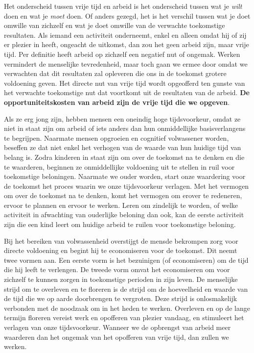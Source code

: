 Het onderscheid tussen vrije tijd en arbeid is het onderscheid tussen
wat je \emph{wilt} doen en wat je \emph{moet} doen. Of anders gezegd,
het is het verschil tussen wat je doet omwille van zichzelf en wat je
doet omwille van de verwachte toekomstige resultaten. Als iemand een
activiteit onderneemt, enkel en alleen omdat hij of zij er plezier in
heeft, ongeacht de uitkomst, dan zou het geen arbeid zijn, maar vrije
tijd. Per definitie heeft arbeid op zichzelf een negatief nut of
ongemak. Werken vermindert de menselijke tevredenheid, maar toch gaan we
ermee door omdat we verwachten dat dit resultaten zal opleveren die ons
in de toekomst grotere voldoening geven. Het directe nut van vrije tijd
wordt opgeofferd ten gunste van het verwachte toekomstige nut dat
voortkomt uit de resultaten van de arbeid. \textbf{De
opportuniteitskosten van arbeid zijn de vrije tijd die we opgeven}.

Als ze erg jong zijn, hebben mensen een oneindig hoge tijdsvoorkeur,
omdat ze niet in staat zijn om arbeid of iets anders dan hun
onmiddellijke basisverlangens te begrijpen. Naarmate mensen opgroeien en
cognitief volwassener worden, beseffen ze dat niet enkel het verhogen
van de waarde van hun huidige tijd van belang is. Zodra kinderen in
staat zijn om over de toekomst na te denken en die te waarderen,
beginnen ze onmiddellijke voldoening uit te stellen in ruil voor
toekomstige beloningen. Naarmate we ouder worden, start onze waardering
voor de toekomst het proces waarin we onze tijdsvoorkeur verlagen. Met
het vermogen om over de toekomst na te denken, komt het vermogen om
erover te redeneren, ervoor te plannen en ervoor te werken. Leren om
zindelijk te worden, of welke activiteit in afwachting van ouderlijke
beloning dan ook, kan de eerste activiteit zijn die een kind leert om
huidige arbeid te ruilen voor toekomstige beloning.

Bij het bereiken van volwassenheid overstijgt de mensde bekrompen zorg
voor directe voldoening en begint hij te economiseren voor de toekomst.
Dit neemt twee vormen aan. Een eerste vorm is het bezuinigen (of
economiseren) om de tijd die hij leeft te verlengen. De tweede vorm
omvat het economiseren om voor zichzelf te kunnen zorgen in toekomstige
perioden in zijn leven. De menselijke strijd om te overleven en te
floreren is de strijd om de hoeveelheid en waarde van de tijd die we op
aarde doorbrengen te vergroten. Deze strijd is onlosmakelijk verbonden
met de noodzaak om in het heden te werken. Overleven en op de lange
termijn floreren vereist werk en opofferen van plezier vandaag, en
stimuleert het verlagen van onze tijdsvoorkeur. Wanneer we de opbrengst
van arbeid meer waarderen dan het ongemak van het opofferen van vrije
tijd, dan zullen we werken.

